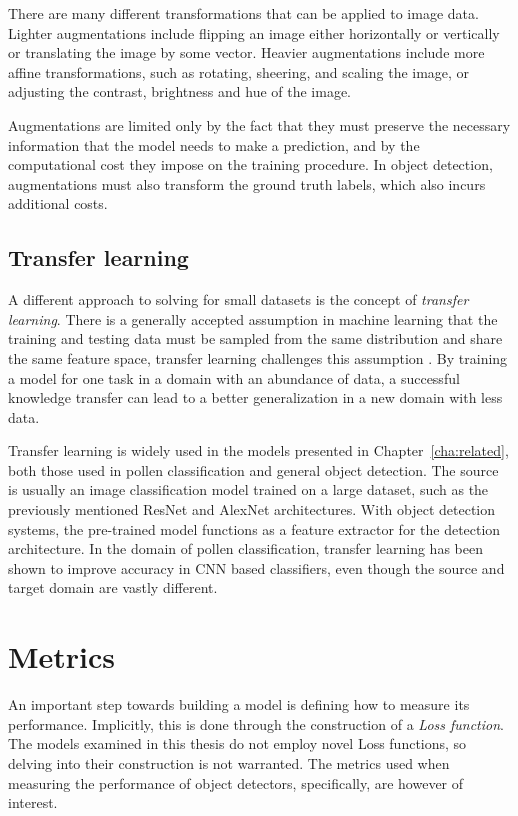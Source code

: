 There are many different transformations that can be applied to image data. Lighter augmentations include flipping an image either horizontally or vertically or translating the image by some vector. Heavier augmentations include more affine transformations, such as rotating, sheering, and scaling the image, or adjusting the contrast, brightness and hue of the image.

Augmentations are limited only by the fact that they must preserve the necessary information that the model needs to make a prediction, and by the computational cost they impose on the training procedure. In object detection, augmentations must also transform the ground truth labels, which also incurs additional costs.

\subsection{Transfer learning}
A different approach to solving for small datasets is the concept of \textit{transfer learning}.
There is a generally accepted assumption in machine learning that the training and testing data must be sampled from the same distribution and share the same feature space, transfer learning challenges this assumption \parencite{pan_yang_2010}.
By training a model for one task in a domain with an abundance of data, a successful knowledge transfer can lead to a better generalization in a new domain with less data.

Transfer learning is widely used in the models presented in Chapter~\ref{cha:related}, both those used in pollen classification and general object detection.
The source is usually an image classification model trained on a large dataset, such as the previously mentioned ResNet and AlexNet architectures.
With object detection systems, the pre-trained model functions as a feature extractor for the detection architecture.
In the domain of pollen classification, transfer learning has been shown to improve accuracy in CNN based classifiers, even though the source and target domain are vastly different.

\section{Metrics}\label{sec:back-metrics}
An important step towards building a model is defining how to measure its performance.
Implicitly, this is done through the construction of a \textit{Loss function}.
The models examined in this thesis do not employ novel Loss functions, so delving into their construction is not warranted.
The metrics used when measuring the performance of object detectors, specifically, are however of interest.


